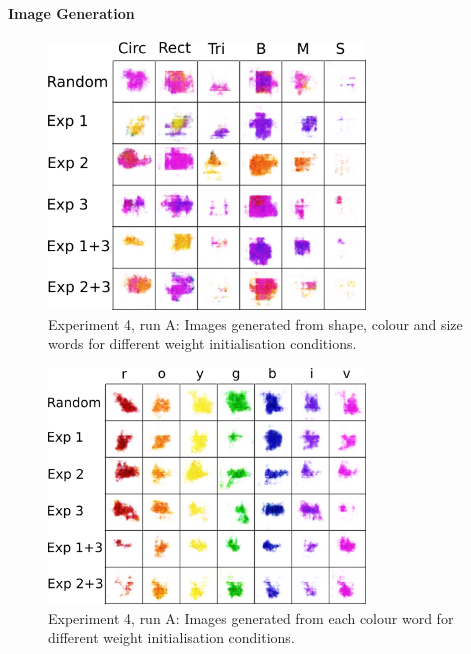 \paragraph{Image Generation}

\begin{figure}
\centering
\includegraphics[width=0.75\textwidth]{Figs/shapes/singlelabel739_shape.png}
\caption{Experiment 4, run A: Images generated from shape, colour and size words for different weight initialisation conditions.}
\label{fig:739single_shape}
\end{figure}

\begin{figure}
\centering
\includegraphics[width=0.75\textwidth]{Figs/shapes/singlelabel739_col.png}
\caption{Experiment 4, run A: Images generated from each colour word for different weight initialisation conditions.}
\label{fig:739single_col}
\end{figure}

